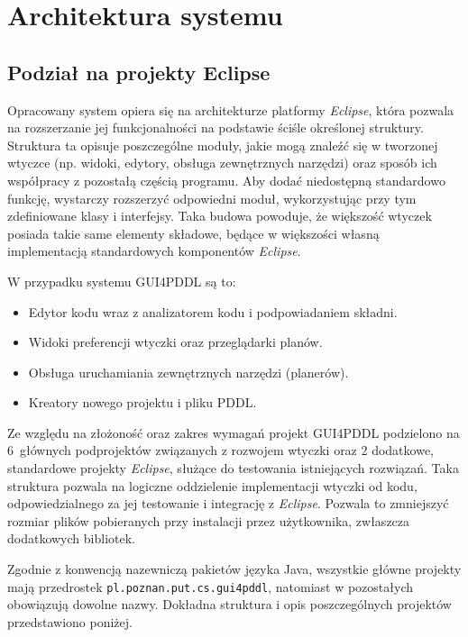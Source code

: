 \chapter{Architektura systemu}
\label{sec:piaty}
\section{Podział na projekty Eclipse}

Opracowany system opiera się na architekturze platformy \emph{Eclipse}, która pozwala na rozszerzanie jej funkcjonalności na podstawie ściśle określonej struktury. Struktura ta opisuje poszczególne moduły, jakie mogą znaleźć się w tworzonej wtyczce (np. widoki, edytory, obsługa zewnętrznych narzędzi) oraz sposób ich współpracy z pozostałą częścią programu. Aby dodać niedostępną standardowo funkcję, wystarczy rozszerzyć odpowiedni moduł, wykorzystując przy tym zdefiniowane klasy i interfejsy. Taka budowa powoduje, że większość wtyczek posiada takie same elementy składowe, będące w większości własną implementacją standardowych komponentów \emph{Eclipse}.

W przypadku systemu GUI4PDDL są to:
\begin{itemize}
\item Edytor kodu wraz z analizatorem kodu i podpowiadaniem składni.
\item Widoki preferencji wtyczki oraz przeglądarki planów.
\item Obsługa uruchamiania zewnętrznych narzędzi (planerów).
\item Kreatory nowego projektu i pliku PDDL.
\end{itemize}

Ze względu na złożoność oraz zakres wymagań projekt GUI4PDDL podzielono na 6~głównych podprojektów związanych z rozwojem wtyczki oraz 2 dodatkowe, standardowe projekty \emph{Eclipse}, służące do testowania istniejących rozwiązań. Taka struktura pozwala na logiczne oddzielenie implementacji wtyczki od kodu, odpowiedzialnego za jej testowanie i integrację z \emph{Eclipse}. Pozwala to zmniejszyć rozmiar plików pobieranych przy instalacji przez użytkownika, zwłaszcza dodatkowych bibliotek.

Zgodnie z konwencją nazewniczą pakietów języka Java, wszystkie główne projekty mają przedrostek \texttt{pl.poznan.put.cs.gui4pddl}, natomiast w pozostałych obowiązują dowolne nazwy. Dokładna struktura i opis poszczególnych projektów przedstawiono poniżej.

